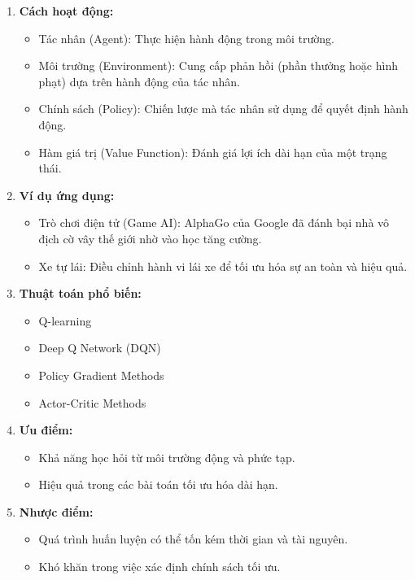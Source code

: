 \documentclass[13pt]{article}
\begin{document}
\begin{enumerate}
\begin{enumerate}
        \item \textbf{Cách hoạt động:}
        \begin{itemize}
            \item Tác nhân (Agent): Thực hiện hành động trong môi trường.
            \item Môi trường (Environment): Cung cấp phản hồi (phần thưởng hoặc hình phạt) dựa trên hành động của tác nhân.
            \item Chính sách (Policy): Chiến lược mà tác nhân sử dụng để quyết định hành động.
            \item Hàm giá trị (Value Function): Đánh giá lợi ích dài hạn của một trạng thái.
        \end{itemize}

        \item \textbf{Ví dụ ứng dụng:}
        \begin{itemize}
            \item Trò chơi điện tử (Game AI): AlphaGo của Google đã đánh bại nhà vô địch cờ vây thế giới nhờ vào học tăng cường.
            \item Xe tự lái: Điều chỉnh hành vi lái xe để tối ưu hóa sự an toàn và hiệu quả.
        \end{itemize}

        \item \textbf{Thuật toán phổ biến:}
        \begin{itemize}
            \item Q-learning
            \item Deep Q Network (DQN)
            \item Policy Gradient Methods
            \item Actor-Critic Methods
        \end{itemize}

        \item \textbf{Ưu điểm: }
        \begin{itemize}
            \item Khả năng học hỏi từ môi trường động và phức tạp.
            \item Hiệu quả trong các bài toán tối ưu hóa dài hạn.
        \end{itemize}

        \item \textbf{Nhược điểm: }
        \begin{itemize}
            \item Quá trình huấn luyện có thể tốn kém thời gian và tài nguyên.
            \item Khó khăn trong việc xác định chính sách tối ưu.
        \end{itemize}
    \end{enumerate}


\end{enumerate}
\end{document}
